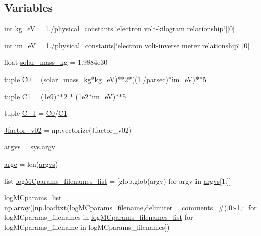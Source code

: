 \subsection*{Variables}
\begin{DoxyCompactItemize}
\item 
int \hyperlink{namespacejfactor_a2881505111ca34d6a84a5b09a5c19a86}{kg\+\_\+eV} = 1./physical\+\_\+constants\mbox{[}\char`\"{}electron volt-\/kilogram relationship\char`\"{}\mbox{]}\mbox{[}0\mbox{]}
\item 
int \hyperlink{namespacejfactor_a3d86861d725265dc096b798369902d43}{im\+\_\+eV} = 1./physical\+\_\+constants\mbox{[}\char`\"{}electron volt-\/inverse meter relationship\char`\"{}\mbox{]}\mbox{[}0\mbox{]}
\item 
float \hyperlink{namespacejfactor_a30f254edbd584a30535a1b98c2916563}{solar\+\_\+mass\+\_\+kg} = 1.\+9884e30
\item 
tuple \hyperlink{namespacejfactor_a69776fb72a257bd354abf1104511a3c7}{C0} = (\hyperlink{namespacejfactor_a30f254edbd584a30535a1b98c2916563}{solar\+\_\+mass\+\_\+kg}$\ast$\hyperlink{namespacejfactor_a2881505111ca34d6a84a5b09a5c19a86}{kg\+\_\+eV})$\ast$$\ast$2$\ast$((1./parsec)$\ast$\hyperlink{namespacejfactor_a3d86861d725265dc096b798369902d43}{im\+\_\+eV})$\ast$$\ast$5
\item 
tuple \hyperlink{namespacejfactor_a2c0c80a124f7a32f943f0b9b38f184d4}{C1} = (1e9)$\ast$$\ast$2 $\ast$ (1e2$\ast$im\+\_\+e\+V)$\ast$$\ast$5
\item 
tuple \hyperlink{namespacejfactor_aaa482b21aae986b864a5adb04d928dab}{C\+\_\+J} = \hyperlink{namespacejfactor_a69776fb72a257bd354abf1104511a3c7}{C0}/\hyperlink{namespacejfactor_a2c0c80a124f7a32f943f0b9b38f184d4}{C1}
\item 
\hyperlink{namespacejfactor_abfd9403bf30810505dc44d7af9746a12}{Jfactor\+\_\+v02} = np.\+vectorize(Jfactor\+\_\+v02)
\item 
\hyperlink{namespacejfactor_a2f38906b89281fb8e6cdc4cbc9c8735e}{argvs} = sys.\+argv
\item 
\hyperlink{namespacejfactor_a7ec02594672c6b2a0a519df5a7648ce2}{argc} = len(\hyperlink{namespacejfactor_a2f38906b89281fb8e6cdc4cbc9c8735e}{argvs})
\item 
list \hyperlink{namespacejfactor_a32ed195f2e906262c560b25bbc440b00}{log\+M\+Cparams\+\_\+filenames\+\_\+list} = \mbox{[}glob.\+glob(argv) for argv in \hyperlink{namespacejfactor_a2f38906b89281fb8e6cdc4cbc9c8735e}{argvs}\mbox{[}1\+:\mbox{]}\mbox{]}
\item 
\hyperlink{namespacejfactor_a025ed272933b6b6f31f688649810e704}{log\+M\+Cparams\+\_\+list} = np.\+array(\mbox{[}np.\+loadtxt(log\+M\+Cparams\+\_\+filename,delimiter=\textquotesingle{},\textquotesingle{},comments=\textquotesingle{}\#\textquotesingle{})\mbox{[}0\+:-\/1,\+:\mbox{]} for log\+M\+Cparams\+\_\+filenames in \hyperlink{namespacejfactor_a32ed195f2e906262c560b25bbc440b00}{log\+M\+Cparams\+\_\+filenames\+\_\+list} for log\+M\+Cparams\+\_\+filename in log\+M\+Cparams\+\_\+filenames\mbox{]})

\end{DoxyCompactItemize}
